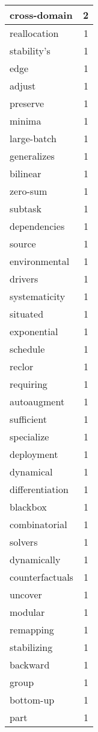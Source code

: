 \begin{table}[h]
\begin{tabular}{|l|r|}
\hline
cross-domain & 2 \\
\hline
reallocation & 1 \\
\hline
stability's & 1 \\
\hline
edge & 1 \\
\hline
adjust & 1 \\
\hline
preserve & 1 \\
\hline
minima & 1 \\
\hline
large-batch & 1 \\
\hline
generalizes & 1 \\
\hline
bilinear & 1 \\
\hline
zero-sum & 1 \\
\hline
subtask & 1 \\
\hline
dependencies & 1 \\
\hline
source & 1 \\
\hline
environmental & 1 \\
\hline
drivers & 1 \\
\hline
systematicity & 1 \\
\hline
situated & 1 \\
\hline
exponential & 1 \\
\hline
schedule & 1 \\
\hline
reclor & 1 \\
\hline
requiring & 1 \\
\hline
autoaugment & 1 \\
\hline
sufficient & 1 \\
\hline
specialize & 1 \\
\hline
deployment & 1 \\
\hline
dynamical & 1 \\
\hline
differentiation & 1 \\
\hline
blackbox & 1 \\
\hline
combinatorial & 1 \\
\hline
solvers & 1 \\
\hline
dynamically & 1 \\
\hline
counterfactuals & 1 \\
\hline
uncover & 1 \\
\hline
modular & 1 \\
\hline
remapping & 1 \\
\hline
stabilizing & 1 \\
\hline
backward & 1 \\
\hline
group & 1 \\
\hline
bottom-up & 1 \\
\hline
part & 1 \\

\end{tabular}
\end{table}
